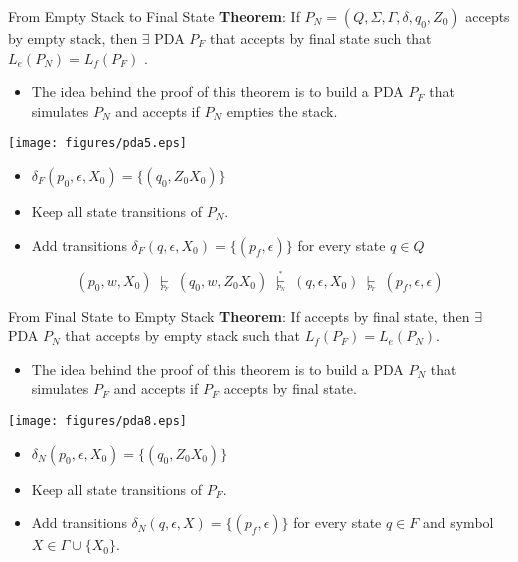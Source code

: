 \documentclass{prosper}%
\newcommand{\e} {{\mbox{$\epsilon$}}}
\newcommand{\cavd}[1]{{\mbox{$\;\overset{_*}{\underset{_#1}{\vdash}}\;$}}}
\newcommand{\avd}[1]{\mbox{$\;{\underset{_#1}{\vdash}\;}$}}
\begin{document}
\begin{slide}{From Empty Stack to Final State}
{\bf Theorem}: If $P_N=(Q, \Sigma, \Gamma, \delta, q_0, Z_0)$ accepts by empty stack, then $\exists$ PDA $P_F$ that accepts by final state such that $L_e(P_N)=L_f(P_F)$ .
\begin{itemize}
\item The idea behind the proof of this theorem is to build a PDA $P_F$ that simulates $P_N$ and accepts if $P_N$ empties the stack.
\end{itemize}
\begin{minipage}{5cm}
\texttt{[image: figures/pda5.eps]}
\end{minipage}
\begin{minipage}{6cm}
\begin{itemize}
\item $\delta_F(p_0,\epsilon,X_0)=\{(q_0, Z_0X_0)\}$
\item Keep all state transitions of $P_N$.
\item Add transitions $\delta_F(q, \epsilon, X_0)=\{(p_f, \epsilon)\}$ for every state $q\in Q$
\end{itemize}
\end{minipage}
\[
(p_0,w,X_0)\avd{{P_F}}(q_0,w,Z_0X_0)\cavd{{P_N}}(q,\e,X_0)\avd{{P_F}}(p_f,\e,\e)
\]
\end{slide}


\begin{slide}{From Final State to Empty Stack}
{\bf Theorem}: If  accepts by final state, then $\exists$ PDA $P_N$ that accepts by empty stack such that $L_f(P_F)=L_e(P_N)$.
\begin{itemize}
\item The idea behind the proof of this theorem is to build a PDA $P_N$ that simulates $P_F$ and accepts if $P_F$ accepts by final state.
\end{itemize}
\begin{minipage}{5cm}
\texttt{[image: figures/pda8.eps]}
\end{minipage}
\begin{minipage}{6cm}
\begin{itemize}
\item $\delta_N(p_0,\epsilon,X_0)=\{(q_0, Z_0X_0)\}$
\item Keep all state transitions of $P_F$.
\item Add transitions $\delta_N(q, \epsilon, X)=\{(p_f, \epsilon)\}$ for every state $q\in F$ and symbol $X\in\Gamma\cup\{X_0\}$.
\end{itemize}
\end{minipage}
\end{slide}
\end{document}
